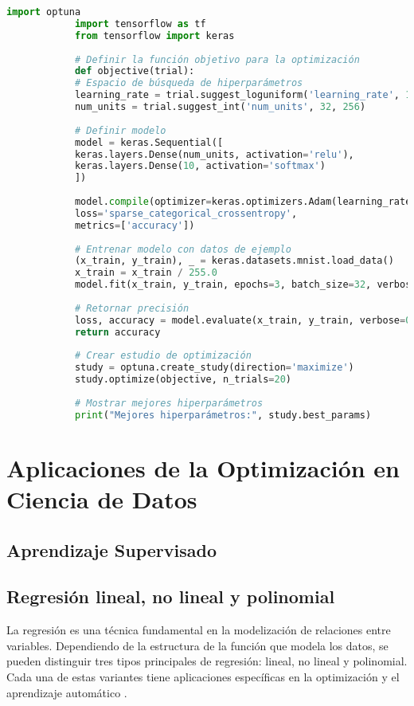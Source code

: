 \begin{itemize}
	\begin{lstlisting}[language=Python, caption={Optimización de hiperparámetros con Optuna}]
			import optuna
			import tensorflow as tf
			from tensorflow import keras
			
			# Definir la función objetivo para la optimización
			def objective(trial):
			# Espacio de búsqueda de hiperparámetros
			learning_rate = trial.suggest_loguniform('learning_rate', 1e-4, 1e-2)
			num_units = trial.suggest_int('num_units', 32, 256)
			
			# Definir modelo
			model = keras.Sequential([
			keras.layers.Dense(num_units, activation='relu'),
			keras.layers.Dense(10, activation='softmax')
			])
			
			model.compile(optimizer=keras.optimizers.Adam(learning_rate=learning_rate),
			loss='sparse_categorical_crossentropy',
			metrics=['accuracy'])
			
			# Entrenar modelo con datos de ejemplo
			(x_train, y_train), _ = keras.datasets.mnist.load_data()
			x_train = x_train / 255.0
			model.fit(x_train, y_train, epochs=3, batch_size=32, verbose=0)
			
			# Retornar precisión
			loss, accuracy = model.evaluate(x_train, y_train, verbose=0)
			return accuracy
			
			# Crear estudio de optimización
			study = optuna.create_study(direction='maximize')
			study.optimize(objective, n_trials=20)
			
			# Mostrar mejores hiperparámetros
			print("Mejores hiperparámetros:", study.best_params)
		\end{lstlisting}
		
		\section{Aplicaciones de la Optimización en Ciencia de Datos}
		
		\subsection{Aprendizaje Supervisado}
		\subsection{Regresión lineal, no lineal y polinomial}
		
		La regresión es una técnica fundamental en la modelización de relaciones entre variables. Dependiendo de la estructura de la función que modela los datos, se pueden distinguir tres tipos principales de regresión: lineal, no lineal y polinomial. Cada una de estas variantes tiene aplicaciones específicas en la optimización y el aprendizaje automático \cite{montgomery2021introduction}.
		

\end{itemize}
